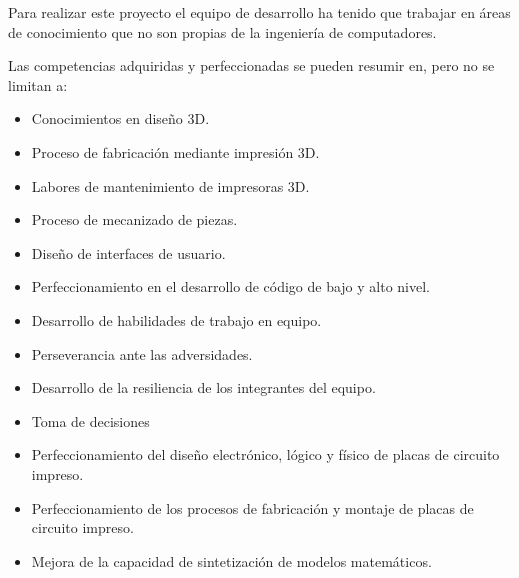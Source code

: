 Para realizar este proyecto el equipo de desarrollo ha tenido que trabajar en áreas de conocimiento que no son propias de la ingeniería de computadores. 

Las competencias adquiridas y perfeccionadas se pueden resumir en, pero no se limitan a:

\begin{itemize}
    \item Conocimientos en diseño 3D.
    \item Proceso de fabricación mediante impresión 3D.
    \item Labores de mantenimiento de impresoras 3D.
    \item Proceso de mecanizado de piezas.
    \item Diseño de interfaces de usuario.
    \item Perfeccionamiento en el desarrollo de código de bajo y alto nivel.
    \item Desarrollo de habilidades de trabajo en equipo.
    \item Perseverancia ante las adversidades.
    \item Desarrollo de la resiliencia de los integrantes del equipo.
    \item Toma de decisiones
    \item Perfeccionamiento del diseño electrónico, lógico y físico de placas de circuito impreso.
    \item Perfeccionamiento de los procesos de fabricación y montaje de placas de circuito impreso.
    \item Mejora de la capacidad de sintetización de modelos matemáticos.
\end{itemize}